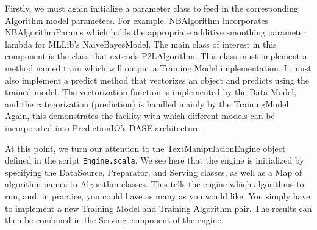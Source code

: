 \documentclass[a4paper,12pt]{article}
\renewcommand{\tt}[1]{\texttt{#1}}
\newcommand{\3}{\left}
\newcommand{\4}{\right}
\renewcommand{\-}[1]{{}^{-#1}}
\begin{document}
Firstly, we must again initialize a parameter class to feed in the corresponding Algorithm model parameters. For example, NBAlgorithm incorporates NBAlgorithmParams which holds the appropriate additive smoothing parameter lambda for MLLib's NaiveBayesModel. The main class of interest in this component is the class that extends P2LAlgorithm.
 This class must implement a method named train which will output a Training Model implementation. It must also implement a predict method that vectorizes an object and predicts using the trained model. The vectorization function is implemented by the Data Model, and the categorization (prediction) is handled mainly by the TrainingModel. Again, this demonstrates the facility with which different models can be incorporated into PredictionIO's DASE architecture.
 
At this point, we turn our attention to the TextManipulationEngine object defined in the script \tt{Engine.scala}. We see here that the engine is initialized by specifying the DataSource, Preparator, and Serving classes, as well as a Map of algorithm names to Algorithm classes. This tells the engine which algorithms to run, and, in practice, you could have as many as you would like. You simply have to implement a new Training Model and Training Algorithm pair. The results can then be combined in the Serving component of the engine. 
\end{document}
